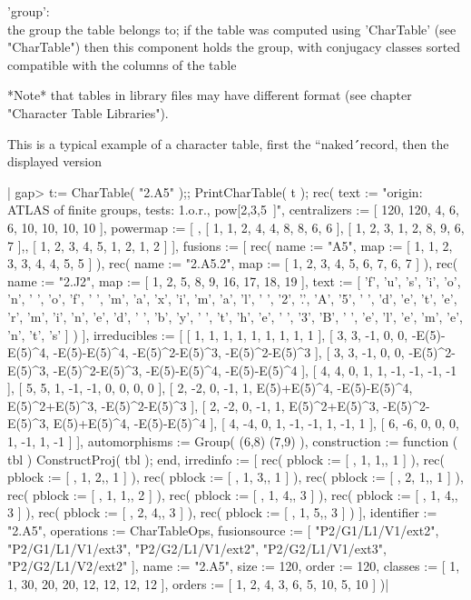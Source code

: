 'group':\\ the group the table belongs to; if the table was computed
           using 'CharTable' (see "CharTable") then this component holds
           the group, with conjugacy classes sorted compatible with the
           columns of the table

*Note* that tables in library files may have different format
(see chapter "Character Table Libraries").

This is a typical example of a character table, first the ``naked\'\'\
record, then the displayed version\:

|    gap> t:= CharTable( "2.A5" );; PrintCharTable( t );
    rec( text := "origin: ATLAS of finite groups, tests: 1.o.r., pow[2,3,5\
    ]", centralizers := [ 120, 120, 4, 6, 6, 10, 10, 10, 10
     ], powermap := [ , [ 1, 1, 2, 4, 4, 8, 8, 6, 6 ],
      [ 1, 2, 3, 1, 2, 8, 9, 6, 7 ],, [ 1, 2, 3, 4, 5, 1, 2, 1, 2 ]
     ], fusions := [ rec(
          name := "A5",
          map := [ 1, 1, 2, 3, 3, 4, 4, 5, 5 ] ), rec(
          name := "2.A5.2",
          map := [ 1, 2, 3, 4, 5, 6, 7, 6, 7 ] ), rec(
          name := "2.J2",
          map := [ 1, 2, 5, 8, 9, 16, 17, 18, 19 ],
          text := [ 'f', 'u', 's', 'i', 'o', 'n', ' ', 'o', 'f', ' ',
              'm', 'a', 'x', 'i', 'm', 'a', 'l', ' ', '2', '.', 'A', '5',
              ' ', 'd', 'e', 't', 'e', 'r', 'm', 'i', 'n', 'e', 'd', ' ',
              'b', 'y', ' ', 't', 'h', 'e', ' ', '3', 'B', ' ', 'e', 'l',
              'e', 'm', 'e', 'n', 't', 's' ] ) ], irreducibles :=
    [ [ 1, 1, 1, 1, 1, 1, 1, 1, 1 ],
      [ 3, 3, -1, 0, 0, -E(5)-E(5)^4, -E(5)-E(5)^4, -E(5)^2-E(5)^3,
          -E(5)^2-E(5)^3 ],
      [ 3, 3, -1, 0, 0, -E(5)^2-E(5)^3, -E(5)^2-E(5)^3, -E(5)-E(5)^4,
          -E(5)-E(5)^4 ], [ 4, 4, 0, 1, 1, -1, -1, -1, -1 ],
      [ 5, 5, 1, -1, -1, 0, 0, 0, 0 ],
      [ 2, -2, 0, -1, 1, E(5)+E(5)^4, -E(5)-E(5)^4, E(5)^2+E(5)^3,
          -E(5)^2-E(5)^3 ],
      [ 2, -2, 0, -1, 1, E(5)^2+E(5)^3, -E(5)^2-E(5)^3, E(5)+E(5)^4,
          -E(5)-E(5)^4 ], [ 4, -4, 0, 1, -1, -1, 1, -1, 1 ],
      [ 6, -6, 0, 0, 0, 1, -1, 1, -1 ] ], automorphisms := Group( (6,8)
    (7,9) ), construction := function ( tbl )
        ConstructProj( tbl );
    end, irredinfo := [ rec(
          pblock := [ , 1, 1,, 1 ] ), rec(
          pblock := [ , 1, 2,, 1 ] ), rec(
          pblock := [ , 1, 3,, 1 ] ), rec(
          pblock := [ , 2, 1,, 1 ] ), rec(
          pblock := [ , 1, 1,, 2 ] ), rec(
          pblock := [ , 1, 4,, 3 ] ), rec(
          pblock := [ , 1, 4,, 3 ] ), rec(
          pblock := [ , 2, 4,, 3 ] ), rec(
          pblock := [ , 1, 5,, 3 ] )
     ], identifier := "2.A5", operations := CharTableOps, fusionsource :=
    [ "P2/G1/L1/V1/ext2", "P2/G1/L1/V1/ext3", "P2/G2/L1/V1/ext2",
      "P2/G2/L1/V1/ext3", "P2/G2/L1/V2/ext2" ], name := "2.A5", size :=
    120, order := 120, classes := [ 1, 1, 30, 20, 20, 12, 12, 12, 12
     ], orders := [ 1, 2, 4, 3, 6, 5, 10, 5, 10 ] )|

